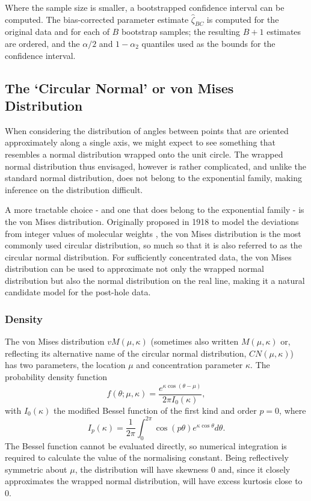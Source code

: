 \documentclass[../../ArchStats.tex]{subfiles}
\begin{document}
Where the sample size is smaller, a bootstrapped confidence interval can be computed. The bias-corrected parameter estimate $\hat{\zeta}_{BC}$ is computed for the original data and for each of $B$ bootstrap samples; the resulting $B+1$ estimates are ordered, and the $\alpha/2$ and $1- \alpha_2$ quantiles used as the bounds for the confidence interval.




\subsection{The `Circular Normal' or von Mises Distribution}
\label{sec:vonMises}

When considering the distribution of angles between points that are oriented approximately along a single axis, we might expect to see something that resembles a normal distribution wrapped onto the unit circle. The wrapped normal distribution thus envisaged, however is rather complicated, and unlike the standard normal distribution, does not belong to the exponential family, making inference on the distribution difficult.

A more tractable choice - and one that does belong to the exponential family - is the von Mises distribution. Originally proposed in 1918 to model the deviations from integer values of molecular weights \cite{VonMises1918}, the von Mises distribution is the most commonly used circular distribution, so much so that it is also referred to as the circular normal distribution. For sufficiently concentrated data, the von Mises distribution can be used to approximate not only the wrapped normal distribution but also the normal distribution on the real line, making it a natural candidate model for the post-hole data.

\subsubsection{Density}
The von Mises distribution $vM(\mu, \kappa)$ (sometimes also written $M(\mu, \kappa)$ or, reflecting its alternative name of the circular normal distribution, $CN(\mu, \kappa)$) has two parameters, the location $\mu$ and concentration parameter $\kappa$. The probability density function 
\[f(\theta; \mu, \kappa) = \frac{e^{\kappa \cos(\theta - \mu)}}{2\pi I_0(\kappa)},\]
with $I_0(\kappa)$ the modified Bessel function of the first kind and order $p=0$, where
\begin{equation}
\label{eq:mod-Bessel}
I_p(\kappa) = \frac{1}{2\pi}\int_0^{2\pi} \cos(p\theta)e^{\kappa \cos \theta} d\theta.
\end{equation}
The Bessel function cannot be evaluated directly, so numerical integration is required to calculate the value of the normalising constant. Being reflectively symmetric about $\mu$, the distribution will have skewness 0 and, since it closely approximates the wrapped normal distribution, will have excess kurtosis close to 0. 
\end{document}
